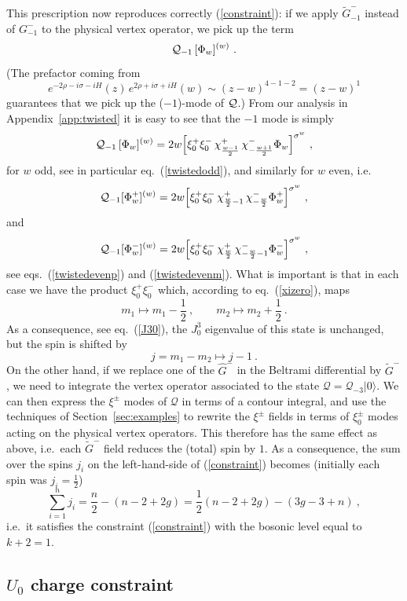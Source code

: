\documentclass[a4paper,11pt]{article}
\numberwithin{equation}{section}
\def\be{\begin{equation}}
\def\ee{\end{equation}}
\begin{document}
This prescription now reproduces correctly (\ref{constraint}): if we apply $\tilde{G}^{-}_{-1}$ instead of $G^-_{-1}$ to the physical vertex operator, we pick up the term
\be
{\cal Q}_{-1}\,  [\Phi_w]^{(w)} \ . 
\ee
(The prefactor coming from 
\be
e^{-2\rho - i\sigma -iH}(z) \, e^{2\rho + i\sigma + iH}(w) \sim (z-w)^{4-1-2} = (z-w)^1 
\ee
guarantees that we pick up the ($-1$)-mode of ${\cal Q}$.) From our analysis in Appendix~\ref{app:twisted} it is easy to see that the $-1$ mode is simply 
\be\label{Qm1odd}
{\cal Q}_{-1}\, [\Phi_w]^{(w)}  = 2 w \Bigl[ \xi^+_0 \xi^-_0 \, {\chi}^+_{\frac{w-1}{2}} \, {\chi}^-_{- \frac{w+1}{2}} \Phi_w\Bigr]^{\sigma^w} \ , 
\ee
for $w$ odd, see in particular eq.~(\ref{twistedodd}), and similarly for $w$ even, i.e.\ 
\be
{\cal Q}_{-1} [\Phi_w^+]^{(w)}  = 2 w \Bigl[ \xi^+_0 \xi^-_0 \, {\chi}^+_{\frac{w}{2}-1} \, {\chi}^-_{- \frac{w}{2}} \Phi_w^+\Bigr]^{\sigma^w} \ , 
\ee
and 
\be
{\cal Q}_{-1} [\Phi_w^-]^{(w)}  = 2 w \Bigl[ \xi^+_0 \xi^-_0 \, {\chi}^+_{\frac{w}{2}} \, {\chi}^-_{- \frac{w}{2}-1} \Phi_w^-\Bigr]^{\sigma^w} \ ,
\ee
see eqs.~(\ref{twistedevenp}) and (\ref{twistedevenm}). What is important is that in each case we have the product $\xi_0^+ \xi_0^-$ which, according to eq.~(\ref{xizero}), maps 
\be
m_1 \mapsto m_1 - \frac{1}{2} \ , \qquad m_2 \mapsto m_2 + \frac{1}{2} \ . 
\ee
As a consequence, see eq.~(\ref{J30}), the $J^3_0$ eigenvalue of this state is unchanged, but the spin is shifted by 
\be
j = m_1 - m_2 \mapsto j -  1 \ . 
\ee
 On the other hand, if we replace one of the $\hat{G}^-$ in the Beltrami differential by $\tilde{G}^-$, we need to integrate the vertex operator associated to the state $\mathcal{Q} = \mathcal{Q}_{-3} |0\rangle$. We can then express the $\xi^\pm$ modes of $\mathcal{Q}$ in terms of a contour integral, and use the techniques of Section~\ref{sec:examples} to rewrite the $\xi^\pm$ fields in terms of $\xi^\pm_0$ modes acting on the physical vertex operators. This therefore has the same effect as above, i.e.\ each $\tilde{G}^-$ field reduces the (total) spin by $1$. As a consequence, the sum over the spins $j_i$ on the left-hand-side of (\ref{constraint}) becomes (initially each spin was $j_i=\tfrac{1}{2}$) 
\be
\sum_{i=1}^{n} j_i = \frac{n}{2} - (n-2 + 2g) = \frac{1}{2} (n-2+2g) - (3g-3+n) \ , 
\ee
i.e.\ it satisfies the constraint (\ref{constraint}) with the bosonic level equal to $k+2=1$. 



\subsection[\texorpdfstring{$U_0$}{U0} charge constraint]{\boldmath \texorpdfstring{$U_0$}{U0} charge constraint}\label{sec:U0charge}
\end{document}

